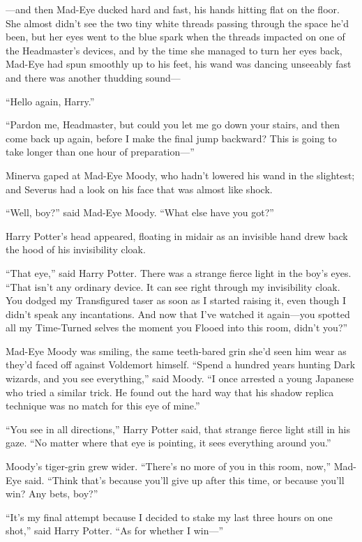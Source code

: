 —and then Mad-Eye ducked hard and fast, his hands hitting flat on the floor. She almost didn’t see the two tiny white threads passing through the space he’d been, but her eyes went to the blue spark when the threads impacted on one of the Headmaster’s devices, and by the time she managed to turn her eyes back, Mad-Eye had spun smoothly up to his feet, his wand was dancing unseeably fast and there was another thudding sound—
\sbreak

“Hello again, Harry.”

“Pardon me, Headmaster, but could you let me go down your stairs, and then come back up again, before I make the final jump backward? This is going to take longer than one hour of preparation—”
\sbreak

Minerva gaped at Mad-Eye Moody, who hadn’t lowered his wand in the slightest; and Severus had a look on his face that was almost like shock.

“Well, boy?” said Mad-Eye Moody. “What else have you got?”

Harry Potter’s head appeared, floating in midair as an invisible hand drew back the hood of his invisibility cloak.

“That eye,” said Harry Potter. There was a strange fierce light in the boy’s eyes. “That isn’t any ordinary device. It can see right through my invisibility cloak. You dodged my Transfigured taser as soon as I started raising it, even though I didn’t speak any incantations. And now that I’ve watched it again—you spotted all my Time-Turned selves the moment you Flooed into this room, didn’t you?”

Mad-Eye Moody was smiling, the same teeth-bared grin she’d seen him wear as they’d faced off against Voldemort himself. “Spend a hundred years hunting Dark wizards, and you see everything,” said Moody. “I once arrested a young Japanese who tried a similar trick. He found out the hard way that his shadow replica technique was no match for this eye of mine.”

“You see in all directions,” Harry Potter said, that strange fierce light still in his gaze. “No matter where that eye is pointing, it sees everything around you.”

Moody’s tiger-grin grew wider. “There’s no more of you in this room, now,” Mad-Eye said. “Think that’s because you’ll give up after this time, or because you’ll win? Any bets, boy?”

“It’s my final attempt because I decided to stake my last three hours on one shot,” said Harry Potter. “As for whether I win—”

